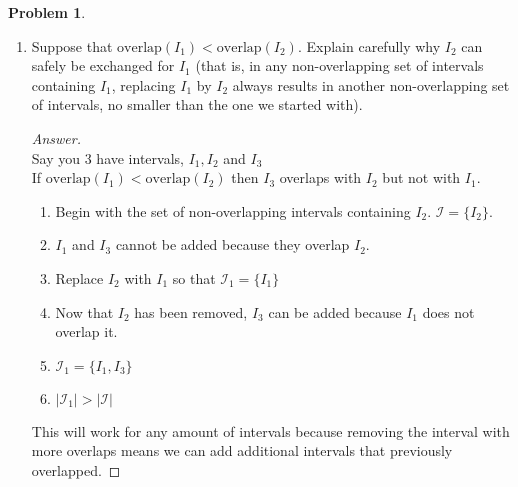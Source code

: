 \documentclass[11pt]{article}
\theoremstyle{definition}
\theoremstyle{definition}
\newtheorem{required}{Problem}
\theoremstyle{definition}
\begin{document}
\begin{required}
\begin{enumerate}[label=(\alph*)]
\vskip 50pt
\item Suppose that $\text{overlap}(I_{1}) < \text{overlap}(I_{2})$. Explain carefully why $I_{2}$ can safely be exchanged for $I_{1}$ (that is, in any non-overlapping set of intervals containing $I_1$, replacing $I_1$ by $I_2$ always results in another non-overlapping set of intervals, no smaller than the one we started with). 
\begin{proof}[Answer] $  $ \\
Say you 3 have intervals, $I_1,I_2$ and $I_3$ \\
If $\text{overlap}(I_{1}) < \text{overlap}(I_{2})$ then $I_3$ overlaps with $I_2$ but not with $I_1$.
\begin{enumerate}
    \item Begin with the set of non-overlapping intervals containing $I_2$. $\mathcal{I} = \{I_2\}$. 
    \item $I_1$ and $I_3$ cannot be added because they overlap $I_2$. 
    \item Replace $I_2$ with $I_1$ so that $\mathcal{I}_1 = \{I_1\}$
    \item Now that $I_2$ has been removed, $I_3$ can be added because $I_1$ does not overlap it.  
    \item $\mathcal{I}_1 = \{I_1,I_3\}$
    \item $|\mathcal{I}_1| > |\mathcal{I}| $
\end{enumerate}
This will work for any amount of intervals because removing the interval with more overlaps means we can add additional intervals that previously overlapped. 
\end{proof}
\end{enumerate}
\end{required}



\end{document}

